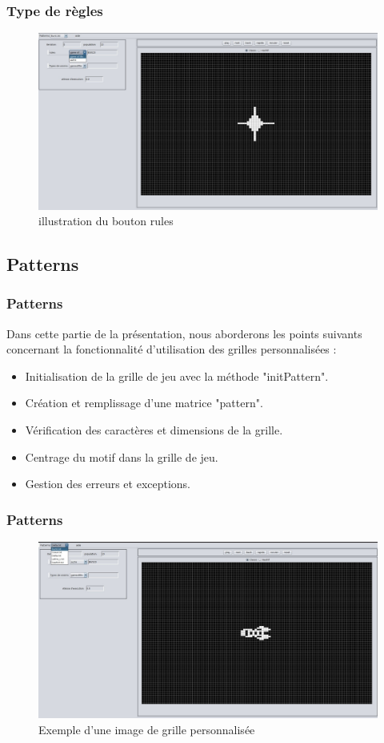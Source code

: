 \documentclass{beamer}
\begin{document}
\begin{frame}
  \frametitle{Type de règles}
 \begin{figure}
   \centering
   \includegraphics[width=1\textwidth]{image3.jpeg}
   \caption{illustration du bouton rules}
   \label{fig:Type de règles}
 \end{figure}
\end{frame}

\subsection{Patterns}
\begin{frame}
  \frametitle{Patterns}
 Dans cette partie de la présentation, nous aborderons les points suivants concernant la fonctionnalité d'utilisation des grilles personnalisées :
 
 \begin{itemize}
 \item Initialisation de la grille de jeu avec la méthode "initPattern".
 \item Création et remplissage d'une matrice "pattern".
 \item Vérification des caractères et dimensions de la grille.
 \item Centrage du motif dans la grille de jeu.
 \item Gestion des erreurs et exceptions.
 \end{itemize}
 
\end{frame}

\begin{frame}
  \frametitle{Patterns}
 \begin{figure}
   \centering
   \includegraphics[width=1\textwidth]{image4.jpeg}
   \caption{Exemple d'une image de grille personnalisée}
   \label{fig:patterns}
 \end{figure}
\end{frame}
\end{document}
